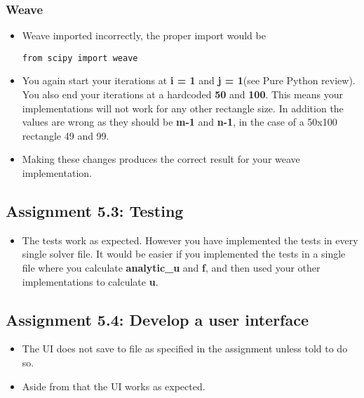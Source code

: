 \documentclass[a4paper]{article}
\begin{document}
\subsubsection*{Weave} \label{sec:Weave}
\begin{itemize}\item Weave imported incorrectly, the proper import would be \\\begin{verbatim}
from scipy import weave
\end{verbatim} 
\item You again start your iterations at \textbf{i = 1} and \textbf{j = 1}(see Pure Python review). You also end your iterations at a hardcoded \textbf{50} and \textbf{100}. This means your implementations will not work for any other rectangle size. In addition the values are wrong as they should be \textbf{m-1} and \textbf{n-1}, in the case of a 50x100 rectangle 49 and 99.
\item Making these changes produces the correct result for your weave implementation.
\end{itemize}

\subsection*{Assignment 5.3: Testing}\label{sec:assignment5.3}
\begin{itemize}
\item The tests work as expected. However you have implemented the tests in every single solver file. It would be easier if you implemented the tests in a single file where you calculate \textbf{analytic\_u} and \textbf{f}, and then used your other implementations to calculate \textbf{u}.

\end{itemize}

\subsection*{Assignment 5.4:  Develop a user interface}\label{sec:assignment5.4}
\begin{itemize}
\item The UI does not save to file as specified in the assignment unless told to do so. 
\item Aside from that the UI works as expected.
\end{itemize} 
\end{document}
